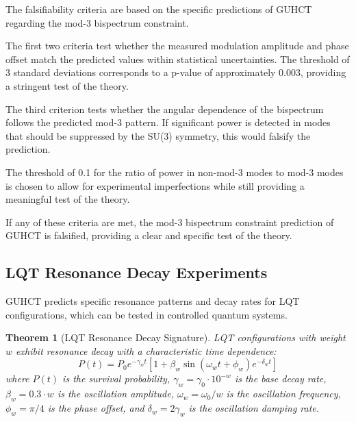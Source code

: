 \documentclass[11pt,a4paper]{article}
\makeatletter
\newtheorem{theorem}{Theorem}[section]
\renewenvironment{proof}[1][\proofname]{\par
  \pushQED{\qed}%
  \normalfont \topsep6\p@\@plus6\p@\relax
  \trivlist
  \item[\hskip\labelsep
        \itshape
    #1\@addpunct{.}]\ignorespaces
}{%
  \popQED\endtrivlist\@endpefalse
}
\makeatother
\begin{document}
\begin{proof}
The falsifiability criteria are based on the specific predictions of GUHCT regarding the mod-3 bispectrum constraint.

The first two criteria test whether the measured modulation amplitude and phase offset match the predicted values within statistical uncertainties. The threshold of 3 standard deviations corresponds to a p-value of approximately 0.003, providing a stringent test of the theory.

The third criterion tests whether the angular dependence of the bispectrum follows the predicted mod-3 pattern. If significant power is detected in modes that should be suppressed by the SU(3) symmetry, this would falsify the prediction.

The threshold of 0.1 for the ratio of power in non-mod-3 modes to mod-3 modes is chosen to allow for experimental imperfections while still providing a meaningful test of the theory.

If any of these criteria are met, the mod-3 bispectrum constraint prediction of GUHCT is falsified, providing a clear and specific test of the theory.
\end{proof}

\subsection{LQT Resonance Decay Experiments}
\label{subsec:lqt_resonance}

GUHCT predicts specific resonance patterns and decay rates for LQT configurations, which can be tested in controlled quantum systems.

\begin{theorem}[LQT Resonance Decay Signature]
\label{thm:resonance_decay}
LQT configurations with weight $w$ exhibit resonance decay with a characteristic time dependence:
\begin{equation}
P(t) = P_0 e^{-\gamma_w t} [1 + \beta_w \sin(\omega_w t + \phi_w) e^{-\delta_w t}]
\end{equation}
where $P(t)$ is the survival probability, $\gamma_w = \gamma_0 \cdot 10^{-w}$ is the base decay rate, $\beta_w = 0.3 \cdot w$ is the oscillation amplitude, $\omega_w = \omega_0 / w$ is the oscillation frequency, $\phi_w = \pi/4$ is the phase offset, and $\delta_w = 2\gamma_w$ is the oscillation damping rate.
\end{theorem}
\end{document}
